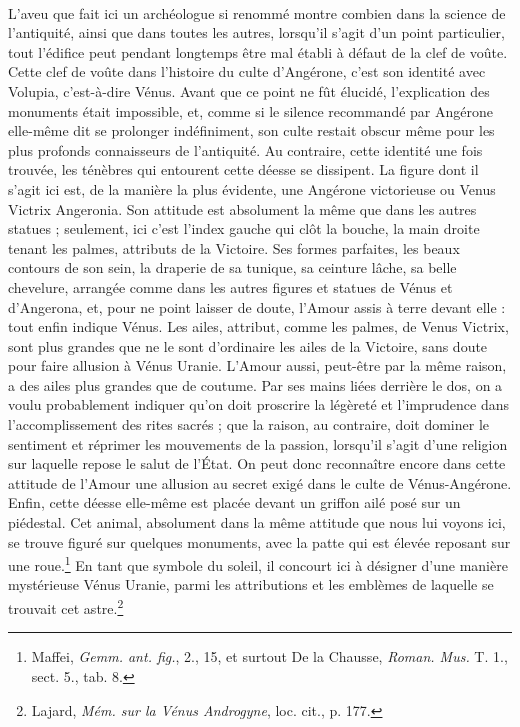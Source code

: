 \documentclass[a4paper, 11pt, oneside, polutonikogreek, french]{article}
\begin{document}
\paragraph{}
L'aveu que fait ici un archéologue si renommé montre combien dans la science de l'antiquité, ainsi que dans toutes les autres, lorsqu'il s'agit d'un point particulier, tout l'édifice peut pendant longtemps être mal établi à défaut de la clef de voûte. Cette clef de voûte dans l'histoire du culte d'Angérone, c'est son identité avec Volupia, c'est-à-dire Vénus. Avant que ce point ne fût élucidé, l'explication des monuments était impossible, et, comme si le silence recommandé par Angérone elle-même dit se prolonger indéfiniment, son culte restait obscur même pour les plus profonds connaisseurs de l'antiquité. Au contraire, cette identité une fois trouvée, les ténèbres qui entourent cette déesse se dissipent. La figure dont il s'agit ici est, de la manière la plus évidente, une Angérone victorieuse ou Venus Victrix Angeronia. Son attitude est absolument la même que dans les autres statues ; seulement, ici c'est l'index gauche qui clôt la bouche, la main droite tenant les palmes, attributs de la Victoire. Ses formes parfaites, les beaux contours de son sein, la draperie de sa tunique, sa ceinture lâche, sa belle chevelure, arrangée comme dans les autres figures et statues de Vénus et d'Angerona, et, pour ne point laisser de doute, l'Amour assis à terre devant elle : tout enfin indique Vénus. Les ailes, attribut, comme les palmes, de Venus Victrix, sont plus grandes que ne le sont d'ordinaire les ailes de la Victoire, sans doute pour faire allusion à Vénus Uranie. L'Amour aussi, peut-être par la même raison, a des ailes plus grandes que de coutume. Par ses mains liées derrière le dos, on a voulu probablement indiquer qu'on doit proscrire la légèreté et l'imprudence dans l'accomplissement des rites sacrés ; que la raison, au contraire, doit dominer le sentiment et réprimer les mouvements de la passion, lorsqu'il s'agit d'une religion sur laquelle repose le salut de l'État. On peut donc reconnaître encore dans cette attitude de l'Amour une allusion au secret exigé dans le culte de Vénus-Angérone. Enfin, cette déesse elle-même est placée devant un griffon ailé posé sur un piédestal. Cet animal, absolument dans la même attitude que nous lui voyons ici, se trouve figuré sur quelques monuments, avec la patte qui est élevée reposant sur une roue.\footnote{Maffei, \emph{Gemm. ant. fig.}, 2., 15, et surtout De la Chausse, \emph{Roman. Mus.} T. 1., sect. 5., tab. 8.} En tant que symbole du soleil, il concourt ici à désigner d'une manière mystérieuse Vénus Uranie, parmi les attributions et les emblèmes de laquelle se trouvait cet astre.\footnote{Lajard, \emph{Mém. sur la Vénus Androgyne}, loc. cit., p. 177.}
\end{document}
